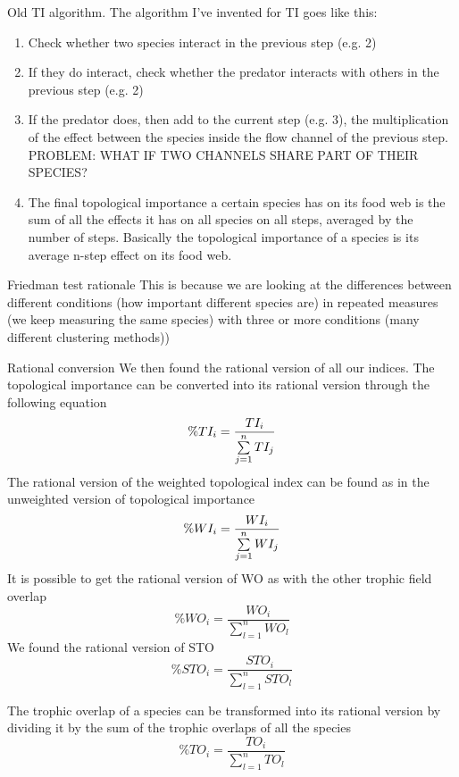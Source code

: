 Old TI algorithm. The algorithm I've invented for TI goes like this:
            \begin{enumerate}
                \item Check whether two species interact in the previous step (e.g. 2)
                \item If they do interact, check whether the predator interacts with others in the previous step (e.g. 2)
                \item If the predator does, then add to the current step (e.g. 3), the multiplication of the effect between the species inside the flow channel of the previous step. PROBLEM: WHAT IF TWO CHANNELS SHARE PART OF THEIR SPECIES?
                \item The final topological importance a certain species has on its food web is the sum of all the effects it has on all species on all steps, averaged by the number of steps. Basically the topological importance of a species is its average n-step effect on its food web. 
            \end{enumerate}

Friedman test rationale
    This is because we are looking at the differences between different conditions (how important different species are) in repeated measures (we keep measuring the same species) with three or more conditions (many different clustering methods))

Rational conversion
        We then found the rational version of all our indices. The topological importance can be converted into its rational version through the following equation
        \begin{equation}
            \%TI_i=\frac{TI_i}{\sum\limits\limits_{j=1}^{n} TI_j}
        \end{equation}
        The rational version of the weighted topological index can be found as in the unweighted version of topological importance
        \begin{equation}
            \%WI_i=\frac{WI_i}{\sum\limits\limits_{j=1}^{n} WI_j}
        \end{equation}
        It is possible to get the rational version of WO as with the other trophic field overlap 
        \begin{equation}
            \%WO_i=\frac{WO_i}{\sum\limits_{l=1}^n WO_l}    
        \end{equation}
        We found the rational version of STO
        \begin{equation}
            \%STO_i=\frac{STO_i}{\sum\limits_{l=1}^n STO_l}
        \end{equation}
        \par The trophic overlap of a species can be transformed into its rational version by dividing it by the sum of the trophic overlaps of all the species 
        \begin{equation} 
            \%TO_i=\frac{TO_i}{\sum\limits_{l=1}^n TO_l} 
        \end{equation} 



